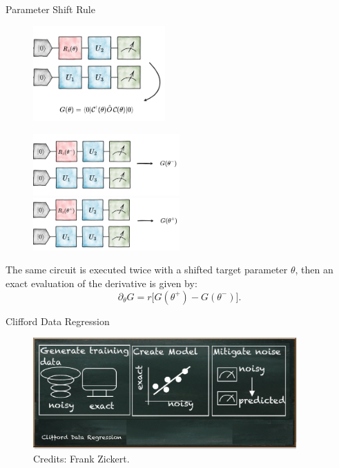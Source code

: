 \documentclass[8pt, xcolor={svgnames}, hyperref={linkcolor=black}]{beamer}
\begin{document}
\begin{frame}{Parameter Shift Rule}
\begin{multicols}{2}
\begin{figure}
    \includegraphics[width=0.45\textwidth]{figures/start.png}
\end{figure}
\begin{figure}  
    \includegraphics[width=0.5\textwidth]{figures/backward.png}
    \includegraphics[width=0.5\textwidth]{figures/forward.png}
\end{figure}
\end{multicols}

The same circuit is executed twice with a shifted target parameter $\theta$, then an 
exact evaluation of the derivative is given by:
$$ \partial_\theta G = r \bigl[ G(\theta^+) - G(\theta^-) \bigr]. $$
\end{frame}

\begin{frame}{Clifford Data Regression}
\begin{figure}
    \includegraphics[width=0.9\textwidth]{figures/cdr.png}
    \caption{Credits: Frank Zickert.}
\end{figure}
\end{frame}
\end{document}
